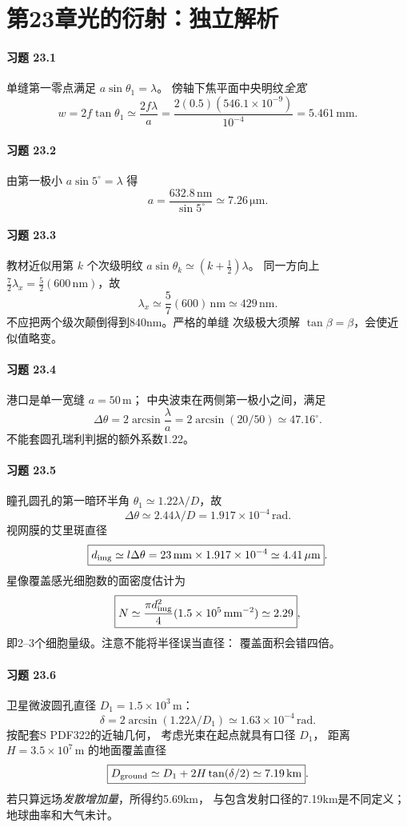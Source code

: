 \section*{第23章\quad 光的衍射：独立解析}
\paragraph{习题 23.1}
单缝第一零点满足 \(a\sin\theta_1=\lambda\)。
傍轴下焦平面中央明纹\emph{全宽}
\[
\boxed{w=2f\tan\theta_1\simeq\frac{2f\lambda}{a}
=\frac{2(0.5)(546.1\times10^{-9})}{10^{-4}}
=5.461\,\mathrm{mm}}.
\]
\paragraph{习题 23.2}
由第一极小 \(a\sin5^\circ=\lambda\) 得
\[
\boxed{a=\frac{632.8\,\mathrm{nm}}{\sin5^\circ}
\simeq7.26\,\mathrm{\mu m}}.
\]
\paragraph{习题 23.3}
教材近似用第 \(k\) 个次级明纹
\(a\sin\theta_k\simeq(k+\frac12)\lambda\)。
同一方向上
\(\frac72\lambda_x=\frac52(600\,\mathrm{nm})\)，故
\[
\boxed{\lambda_x\simeq\frac57(600)\,\mathrm{nm}
\simeq429\,\mathrm{nm}}.
\]
不应把两个级次颠倒得到840nm。严格的单缝
次级极大须解 \(\tan\beta=\beta\)，会使近似值略变。
\paragraph{习题 23.4}
港口是单一宽缝 \(a=50\,\mathrm m\)；
中央波束在两侧第一极小之间，满足
\[
\boxed{\Delta\theta=2\arcsin\frac{\lambda}{a}
=2\arcsin(20/50)\simeq47.16^\circ}.
\]
不能套圆孔瑞利判据的额外系数1.22。
\paragraph{习题 23.5}
瞳孔圆孔的第一暗环半角
\(\theta_1\simeq1.22\lambda/D\)，故
\[
\boxed{\Delta\theta\simeq2.44\lambda/D
=1.917\times10^{-4}\,\mathrm{rad}}.
\]
视网膜的艾里斑直径
\[
\boxed{d_{\rm img}\simeq l\Delta\theta
=23\,\mathrm{mm}\times1.917\times10^{-4}
\simeq4.41\,\mathrm{\mu m}}.
\]
星像覆盖感光细胞数的面密度估计为
\[
\boxed{N\simeq\frac{\pi d_{\rm img}^2}{4}
(1.5\times10^5\,\mathrm{mm^{-2}})
\simeq2.29},
\]
即2--3个细胞量级。注意不能将半径误当直径：
覆盖面积会错四倍。
\paragraph{习题 23.6}
卫星微波圆孔直径 \(D_1=1.5\times10^3\,\mathrm m\)：
\[
\boxed{\delta=2\arcsin(1.22\lambda/D_1)
\simeq1.63\times10^{-4}\,\mathrm{rad}}.
\]
按配套S PDF322的近轴几何，
考虑光束在起点就具有口径 \(D_1\)，
距离 \(H=3.5\times10^7\,\mathrm m\) 的地面覆盖直径
\[
\boxed{D_{\rm ground}\simeq D_1+2H\tan(\delta/2)
\simeq7.19\,\mathrm{km}}.
\]
若只算远场\emph{发散增加量}，所得约5.69km，
与包含发射口径的7.19km是不同定义；
地球曲率和大气未计。
